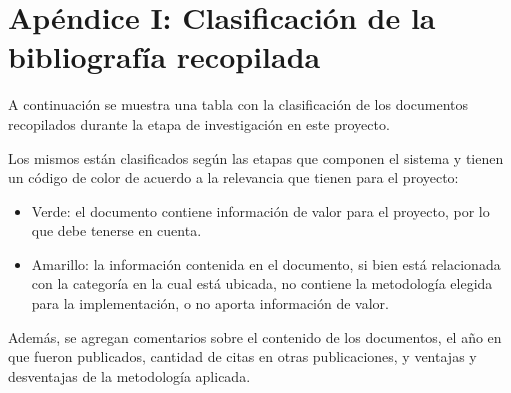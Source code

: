 \chapter{Apéndice I: Clasificación de la bibliografía recopilada}
\label{tablabiblio}
A continuación se muestra una tabla con la clasificación de los documentos recopilados durante la etapa de investigación en este proyecto.

Los mismos están clasificados según las etapas que componen el sistema y tienen un código de color de acuerdo a la relevancia que tienen para el proyecto:
\begin{itemize}
	\item Verde: el documento contiene información de valor para el proyecto, por lo que debe tenerse en cuenta.
	\item Amarillo: la información contenida en el documento, si bien está relacionada con la categoría en la cual está ubicada, no contiene la metodología elegida para la implementación, o no aporta información de valor. 
\end{itemize}

Además, se agregan comentarios sobre el contenido de los documentos, el año en que fueron publicados, cantidad de citas en otras publicaciones, y ventajas y desventajas de la metodología aplicada.


